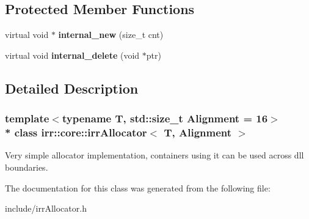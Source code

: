 \subsection*{Protected Member Functions}
\begin{DoxyCompactItemize}
\item 
virtual void $\ast$ {\bfseries internal\+\_\+new} (size\+\_\+t cnt)\hypertarget{classirr_1_1core_1_1irrAllocator_a6fa3d3e83f4327f1e06c76566efe987b}{}\label{classirr_1_1core_1_1irrAllocator_a6fa3d3e83f4327f1e06c76566efe987b}

\item 
virtual void {\bfseries internal\+\_\+delete} (void $\ast$ptr)\hypertarget{classirr_1_1core_1_1irrAllocator_aca46b2c1fd15b7c6b0de206c7197755a}{}\label{classirr_1_1core_1_1irrAllocator_aca46b2c1fd15b7c6b0de206c7197755a}

\end{DoxyCompactItemize}


\subsection{Detailed Description}
\subsubsection*{template$<$typename T, std\+::size\+\_\+t Alignment = 16$>$\\*
class irr\+::core\+::irr\+Allocator$<$ T, Alignment $>$}

Very simple allocator implementation, containers using it can be used across dll boundaries. 

The documentation for this class was generated from the following file\+:\begin{DoxyCompactItemize}
\item 
include/irr\+Allocator.\+h\end{DoxyCompactItemize}

